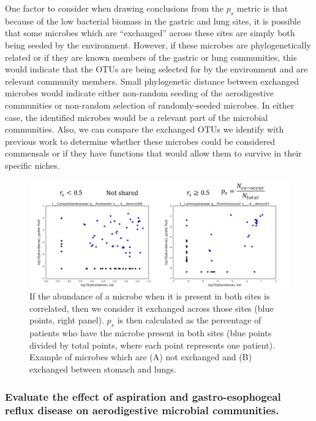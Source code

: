 \documentclass[12pt]{article}
\begin{document}
One factor to consider when drawing conclusions from the $p_s$ metric 
is that because of the low bacterial biomass in the gastric and lung 
sites, it is possible that some microbes which are ``exchanged'' across 
these sites are simply both being seeded by the environment. However, 
if these microbes are phylogenetically related or if they are known 
members of the gastric or lung communities, this would indicate that 
the OTUs are being selected for by the environment and are relevant 
community members. Small phylogenetic distance between exchanged microbes
would indicate either non-random seeding of the aerodigestive communities 
or non-random selection of randomly-seeded microbes. In either case, the
identified microbes would be a relevant part of the microbial communities.
Also, we can compare the exchanged OTUs we identify with previous work
to determine whether these microbes could be considered commensals or
if they have functions that would allow them to survive in their specific niches.

\begin{figure}
\begin{center}
    \includegraphics[scale=0.65]{sharedness_definition}
    \caption{If the abundance of a microbe when it is 
    present in both sites is correlated, then we consider it exchanged 
    across those sites (blue points, right panel). $p_s$ is then calculated as the 
    percentage of patients who have the microbe present in both sites (blue 
    points divided by total points, where each point represents one patient). 
    Example of microbes which are (A) not exchanged and (B) exchanged between stomach and lungs.}\label{fig:sharedness_defn}
\end{center}
\end{figure}

\subsubsection{Evaluate the effect of aspiration and gastro-esophogeal reflux disease on aerodigestive microbial communities.}
\end{document}
